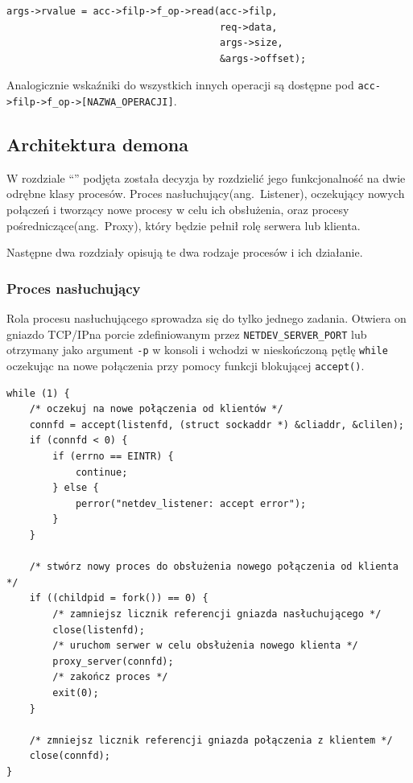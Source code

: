 \documentclass[11pt]{scrartcl}
\begin{document}
\begin{verbatim}
args->rvalue = acc->filp->f_op->read(acc->filp,
                                     req->data,
                                     args->size,
                                     &args->offset);
\end{verbatim}

Analogicznie wskaźniki do wszystkich innych operacji są dostępne pod \newline\texttt{acc-\textgreater{}filp-\textgreater{}f\_op-\textgreater{}{[}NAZWA\_OPERACJI{]}}.

\subsection{Architektura demona}

W rozdziale ``'' podjęta została decyzja by rozdzielić jego funkcjonalność na dwie odrębne klasy procesów. Proces nasłuchujący(ang.\ Listener), oczekujący nowych połączeń i tworzący nowe procesy w celu ich obsłużenia, oraz procesy pośredniczące(ang.\ Proxy), który będzie pełnił rolę serwera lub klienta.

Następne dwa rozdziały opisują te dwa rodzaje procesów i ich działanie.

\subsubsection{Proces nasłuchujący}

Rola procesu nasłuchującego sprowadza się do tylko jednego zadania.  Otwiera on gniazdo TCP/IP\@ na porcie zdefiniowanym przez \texttt{NETDEV\_SERVER\_PORT} lub otrzymany jako argument \texttt{-p} w konsoli i wchodzi w nieskończoną pętlę \texttt{while} oczekując na nowe połączenia przy pomocy funkcji blokującej \texttt{accept()}.

\begin{verbatim}
while (1) {
    /* oczekuj na nowe połączenia od klientów */
    connfd = accept(listenfd, (struct sockaddr *) &cliaddr, &clilen);
    if (connfd < 0) {
        if (errno == EINTR) {
            continue;
        } else {
            perror("netdev_listener: accept error");
        }
    }

    /* stwórz nowy proces do obsłużenia nowego połączenia od klienta */
    if ((childpid = fork()) == 0) {
        /* zamniejsz licznik referencji gniazda nasłuchującego */
        close(listenfd);
        /* uruchom serwer w celu obsłużenia nowego klienta */
        proxy_server(connfd);
        /* zakończ proces */
        exit(0);
    }

    /* zmniejsz licznik referencji gniazda połączenia z klientem */
    close(connfd);
}
\end{verbatim}
\end{document}
